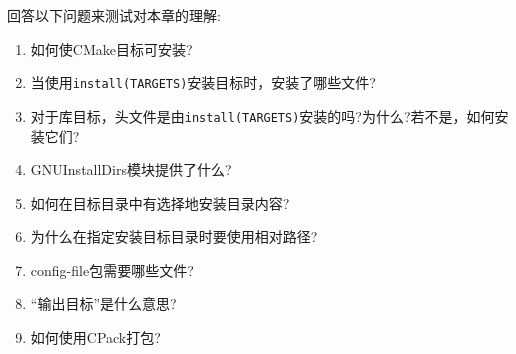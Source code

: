 回答以下问题来测试对本章的理解:

\begin{enumerate}
\item 
如何使CMake目标可安装?

\item 
当使用\texttt{install(TARGETS)}安装目标时，安装了哪些文件?

\item 
对于库目标，头文件是由\texttt{install(TARGETS)}安装的吗?为什么?若不是，如何安装它们?

\item 
GNUInstallDirs模块提供了什么?

\item 
如何在目标目录中有选择地安装目录内容?

\item 
为什么在指定安装目标目录时要使用相对路径?

\item 
config-file包需要哪些文件?

\item 
“输出目标”是什么意思?

\item 
如何使用CPack打包?
\end{enumerate}